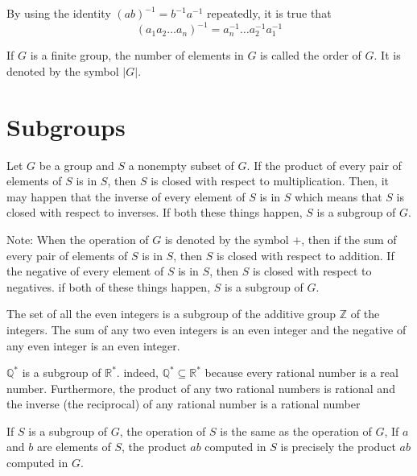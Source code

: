 \documentclass[12pt]{article}
\newcommand{\inverse}[1]{#1 ^{-1}}
\newcommand{\pinverse}[1]{(#1)^{-1}}
\newcommand{\integers}{\mathds{Z}}
\newcommand{\nonzerorationals}{\mathds{Q}^*}
\newcommand{\reals}{\mathds{R}}
\begin{document}
By using the identity $\pinverse{ab} = \inverse{b}\inverse{a}$ repeatedly, it is true that 
$$ \pinverse{a_1a_2\dots a_n} = \inverse{a_n}\dots\inverse{a_2}\inverse{a_1}$$ 

\begin{definition} If $G$ is a finite group, the number of elements in $G$ is called the order of $G$. It is denoted by the symbol $|G|$. \end{definition} 

\section{Subgroups}

\begin{definition} Let $G$ be a group and $S$ a nonempty subset of $G$. If the product of every pair of elements of $S$ is in $S$, then $S$ is closed with respect to multiplication. Then, it may happen that the inverse of every element of $S$ is in $S$ which means that $S$ is closed with respect to inverses. If both these things happen, $S$ is a subgroup of $G$. \end{definition} 

Note: When the operation of $G$ is denoted by the symbol $+$, then if the sum of every pair of elements of $S$ is in $S$, then $S$ is closed with respect to addition. If the negative of every element of $S$ is in $S$, then $S$ is closed with respect to negatives. if both of these things happen, $S$ is a subgroup of $G$. 

\begin{example} The set of all the even integers is a subgroup of the additive group $\integers$ of the integers. The sum of any two even integers is an even integer and the negative of any even integer is an even integer. \end{example} 

\begin{example} $\nonzerorationals$ is a subgroup of $\reals^*$. indeed, $\nonzerorationals \subseteq \reals^*$ because every rational number is a real number. Furthermore, the product of any two rational numbers is rational and the inverse (the reciprocal) of any rational number is a rational number \end{example}

If $S$ is a subgroup of $G$, the operation of $S$ is the same as the operation of $G$, If $a$ and $b$ are elements of $S$, the product $ab$ computed in $S$ is precisely the product $ab$ computed in $G$. 
\end{document}
